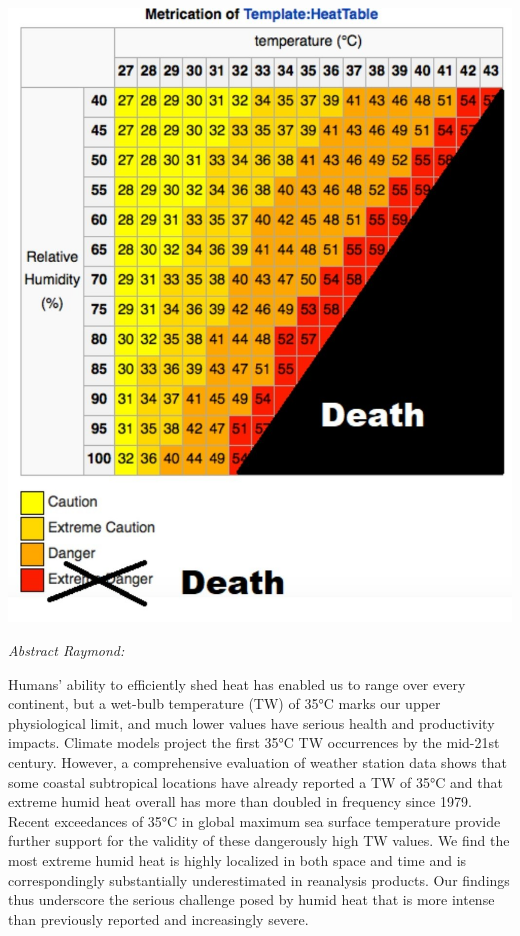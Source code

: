 \documentclass[
]{book}
\begin{document}
\includegraphics{fig/wet_bulb_death.jpeg}

\emph{Abstract Raymond:}

Humans' ability to efficiently shed heat has enabled us to range over every continent,
but a wet-bulb temperature (TW) of 35°C marks our upper physiological limit,
and much lower values have serious health and productivity impacts.
Climate models project the first 35°C TW occurrences by the mid-21st century.
However, a comprehensive evaluation of weather station data shows that
some coastal subtropical locations have already reported a TW of 35°C and
that extreme humid heat overall has more than doubled in frequency since 1979.
Recent exceedances of 35°C in global maximum sea surface temperature provide further
support for the validity of these dangerously high TW values.
We find the most extreme humid heat is highly localized in both space and time and
is correspondingly substantially underestimated in reanalysis products.
Our findings thus underscore the serious challenge posed by humid heat
that is more intense than previously reported and increasingly severe.
\end{document}

